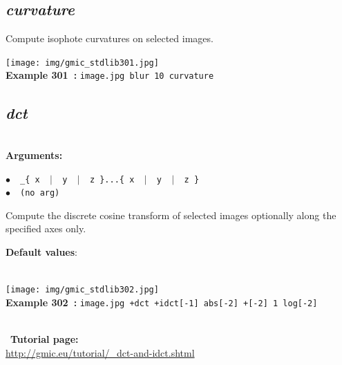 \documentclass[a4paper,10.5pt,twoside]{book}
\def\comma{\discretionary{,}{}{,}}
\newcommand{\Cb}[1]{\textcolor{cb}{#1}}
\newcommand{\Cc}[1]{\textcolor{cc}{#1}}
\begin{document}
\subsection{\emph{curvature} }\vspace*{-0.7em}
Compute isophote curvatures on selected images.
\begin{center}\texttt{[image: img/gmic\_stdlib301.jpg]}\\
{\footnotesize \textbf{Example 301~:} \texttt{image.jpg blur 10 curvature}}
\end{center}

\subsection{\emph{dct} }\vspace*{-0.7em}
~\\\textbf{\Cb{Arguments: }}\begin{flushleft}
{\small \Cb{\hspace*{0.5cm}$\bullet$~~\texttt{\_\{ x ~$|$~ y ~$|$~ z \}...\{ x ~$|$~ y ~$|$~ z \}}}}~~~\\
{\small \Cb{\hspace*{0.5cm}$\bullet$~~\texttt{(no arg)}}}\end{flushleft}
Compute the discrete cosine transform of selected images{\comma}
optionally along the specified axes only.
\begin{flushleft}\Cc{\textbf{Default values}:\\~\\\hspace*{0.5cm}{\small $\bullet$~~\texttt{(no arg)}}}\end{flushleft}
\begin{center}\texttt{[image: img/gmic\_stdlib302.jpg]}\\
{\footnotesize \textbf{Example 302~:} \texttt{image.jpg +dct +idct[-1] abs[-2] +[-2] 1 log[-2]}}
\end{center}
~\\
~\textbf{Tutorial page: }\\\url{http://gmic.eu/tutorial/\_dct-and-idct.shtml}
\end{document}

